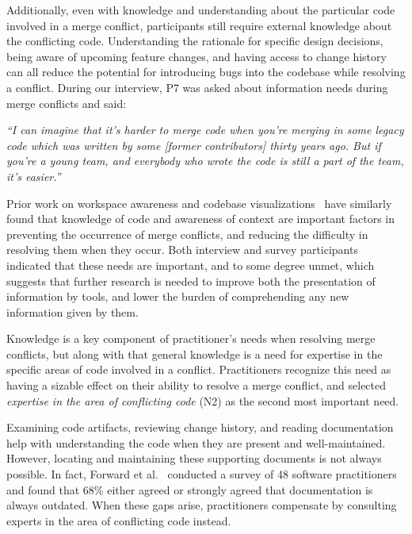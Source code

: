 Additionally, even with knowledge and understanding about the particular code involved in a merge conflict, participants still require external knowledge about the conflicting code.
Understanding the rationale for specific design decisions, being aware of upcoming feature changes, and having access to change history can all reduce the potential for introducing bugs into the codebase while resolving a conflict.
During our interview, P7 was asked about information needs during merge conflicts and said:
\begin{displayquote}
\textit{``I can imagine that it's harder to merge code when you're merging in some legacy code which was written by some [former contributors] thirty years ago. But if you're a young team, and everybody who wrote the code is still a part of the team, it's easier.''}
\end{displayquote}

Prior work on workspace awareness and codebase visualizations~\cite{palantir}\cite{lanza_manhattan} have similarly found that knowledge of code and awareness of context are important factors in preventing the occurrence of merge conflicts, and reducing the difficulty in resolving them when they occur.
Both interview and survey participants indicated that these needs are important, and to some degree unmet, which suggests that further research is needed to improve both the presentation of information by tools, and lower the burden of comprehending any new information given by them.

Knowledge is a key component of practitioner's needs when resolving merge conflicts, but along with that general knowledge is a need for expertise in the specific areas of code involved in a conflict.
Practitioners recognize this need as having a sizable effect on their ability to resolve a merge conflict, and selected \textit{expertise in the area of conflicting code} (N2) as the second most important need.

Examining code artifacts, reviewing change history, and reading documentation help with understanding the code when they are present and well-maintained.
However, locating and maintaining these supporting documents is not always possible.
In fact, Forward et al.~\cite{forward2002documentation} conducted a survey of 48 software practitioners and found that 68\% either agreed or strongly agreed that documentation is always outdated.
When these gaps arise, practitioners compensate by consulting experts in the area of conflicting code instead.


